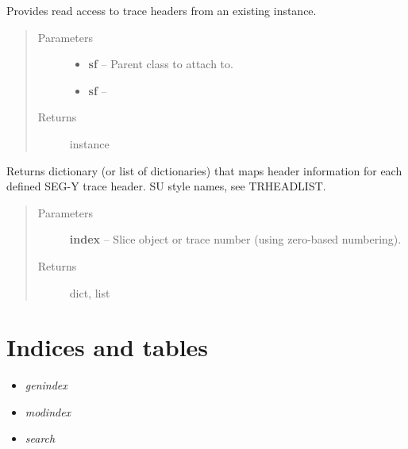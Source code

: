 \documentclass[letterpaper,10pt,english]{sphinxmanual}
\begin{document}
\begin{fulllineitems}
\label{segyread:pygeo.segyread.SEGYTraceHeader}
Provides read access to trace headers from an existing {\hyperref[segyread:pygeo.segyread.SEGYFile]{}} instance.
\begin{quote}\begin{description}
\item[{Parameters}] \leavevmode\begin{itemize}
\item {} 
\textbf{sf} -- Parent class to attach to.

\item {} 
\textbf{sf} -- {\hyperref[segyread:pygeo.segyread.SEGYFile]{}}

\end{itemize}

\item[{Returns}] \leavevmode
{\hyperref[segyread:pygeo.segyread.SEGYTraceHeader]{}} instance

\end{description}\end{quote}

\begin{fulllineitems}
\label{segyread:pygeo.segyread.SEGYTraceHeader.__getitem__}
Returns dictionary (or list of dictionaries) that maps header information
for each defined SEG-Y trace header.  SU style names, see TRHEADLIST.
\begin{quote}\begin{description}
\item[{Parameters}] \leavevmode
\textbf{index} -- Slice object or trace number (using zero-based numbering).

\item[{Returns}] \leavevmode
dict, list

\end{description}\end{quote}

\end{fulllineitems}


\end{fulllineitems}



\chapter{Indices and tables}
\label{index:indices-and-tables}\begin{itemize}
\item {} 
\emph{genindex}

\item {} 
\emph{modindex}

\item {} 
\emph{search}

\end{itemize}
\end{document}
